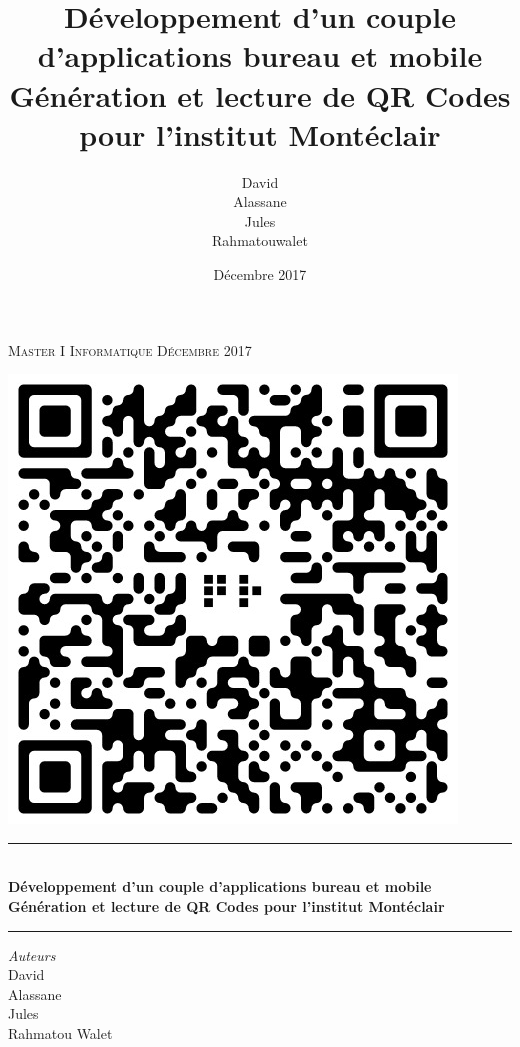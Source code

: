 \documentclass{report}
\title{%
		Développement d'un couple d'applications bureau et mobile\\ \large
		Génération et lecture de QR Codes pour l'institut Montéclair}
\author{David \bsc{Dembele}\\ Alassane \bsc{Diop}\\
		Jules \bsc{Leguy}\\ Rahmatouwalet \bsc{Mohamedoun}}
\date{Décembre 2017}
\begin{document}
\begin{titlepage}
	\centering
	\begin{flushleft}
		\textsc{Master I Informatique} \hspace{10.5cm} \textsc{Décembre 2017}

	\end{flushleft}
	
	\begin{flushright}
	\end{flushright}		
	
    \vspace*{4 cm}
    \includegraphics[scale = 0.25]{img/qr.jpeg}\\[1 cm]
	\rule{\linewidth }{0.2 mm} \\[0.15 cm]
    {\LARGE \textbf{Développement d'un couple d'applications bureau et mobile}\\[0.2cm] \large
		\textbf{Génération et lecture de QR Codes pour l'institut Montéclair}}\\
	\rule{\linewidth}{0.2 mm}
       \vspace*{0.5 cm}
	
	\begin{center}
	
	\emph{Auteurs}\\
	\vspace{0.1cm}
	David \\ 
	Alassane \\
	Jules \\ 
	Rahmatou Walet 
	

\end{center}
\end{titlepage}
\end{document}
